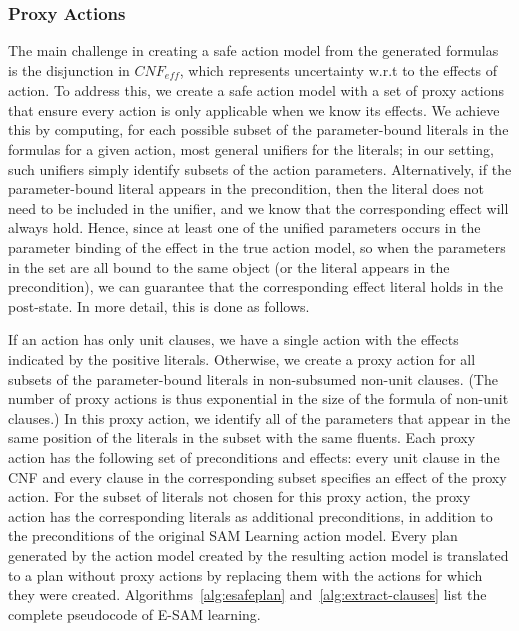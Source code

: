 \documentclass{article}
\newcommand{\eff}{\textit{eff}}
\newcommand{\cnf}{\textit{CNF}}
\begin{document}
\subsubsection{Proxy Actions}
The main challenge in creating a safe action model from the generated formulas is the disjunction in $\cnf_\eff$, which represents uncertainty w.r.t to the effects of action. 
To address this, we create a safe action model with a set of proxy actions that ensure every action is only applicable when we know its effects. We achieve this by computing, for each possible subset of the parameter-bound literals in the formulas for a given action, most general unifiers for the literals; in our setting, such unifiers simply identify subsets of the action parameters. Alternatively, if the parameter-bound literal appears in the precondition, then the literal does not need to be included in the unifier, and we know that the corresponding effect will always hold. Hence, since at least one of the unified parameters occurs in the parameter binding of the effect in the true action model, so when the parameters in the set are all bound to the same object (or the literal appears in the precondition), we can guarantee that the corresponding effect literal holds in the post-state.  In more detail, this is done as follows. 

If an action has only unit clauses, we have a single action with the effects indicated by the positive literals. Otherwise, we create a proxy action for all subsets of the parameter-bound literals in non-subsumed non-unit clauses. (The number of proxy actions is thus exponential in the size of the formula of non-unit clauses.) In this proxy action, we identify all of the parameters that appear in the same position of the literals in the subset with the same fluents. Each proxy action has the following set of preconditions and effects: every unit clause in the CNF and every clause in the corresponding subset specifies an effect of the proxy action. For the subset of literals not chosen for this proxy action, the proxy action has the corresponding literals as additional preconditions, in addition to the preconditions of the original SAM Learning action model. 
Every plan generated by the action model created by the resulting action model is translated to a plan without proxy actions by replacing them with the actions for which they were created. 
Algorithms~\ref{alg:esafeplan} and~\ref{alg:extract-clauses} list the complete pseudocode of E-SAM learning. 
\end{document}
